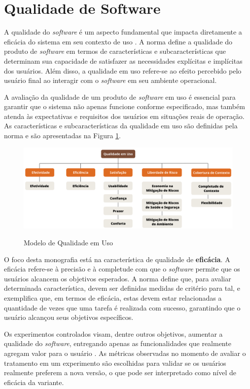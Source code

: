 \section{Qualidade de Software}

A qualidade do \textit{software} é um aspecto fundamental que impacta diretamente a eficácia do sistema em seu contexto de uso . A norma  define a qualidade do produto de \textit{software} em termos de características e subcaracterísticas que determinam sua capacidade de satisfazer as necessidades explícitas e implícitas dos usuários. Além disso, a qualidade em uso refere-se ao efeito percebido pelo usuário final ao interagir com o \textit{software} em seu ambiente operacional.

A avaliação da qualidade de um produto de \textit{software} em uso é essencial para garantir que o sistema não apenas funcione conforme especificado, mas também atenda às expectativas e requisitos dos usuários em situações reais de operação. As características e subcaracterísticas da qualidade em uso são definidas pela norma  e são apresentadas na Figura \ref{fig:quality-in-use}.

\begin{figure}[h]
\centering
\caption{Modelo de Qualidade em Uso}
\includegraphics[width=1\linewidth]{figuras/quality_in_use.png}
\label{fig:quality-in-use}
\end{figure}

O foco desta monografia está na característica de qualidade de \textbf{eficácia}. A eficácia refere-se à precisão e à completude com que o \textit{software} permite que os usuários alcancem os objetivos esperados. A norma  define que, para avaliar determinada característica, devem ser definidas medidas de critério para tal, e exemplifica que, em termos de eficácia, estas devem estar relacionadas a quantidade de vezes que uma tarefa é realizada com sucesso, garantindo que o usuário alcançou seus objetivos específicos.

Os experimentos controlados visam, dentre outros objetivos, aumentar a qualidade do \textit{software}, entregando apenas as funcionalidades que realmente agregam valor para o usuário \cite{fabijan_online_2020}. As métricas observadas no momento de avaliar o tratamento em um experimento são escolhidas para validar se os usuários realmente preferem a nova versão, o que pode ser interpretado como nível de eficácia da variante.
